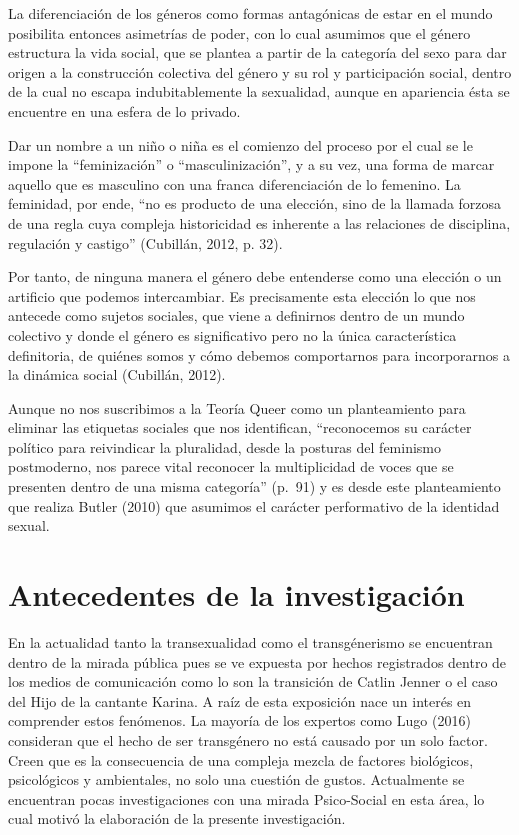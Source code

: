 La diferenciación de los géneros como formas antagónicas de estar en el mundo
posibilita entonces asimetrías de poder, con lo cual asumimos que el género
estructura la vida social, que se plantea a partir de la categoría del sexo para
dar origen a la construcción colectiva del género y su rol y participación
social, dentro de la cual no escapa indubitablemente la sexualidad, aunque en
apariencia ésta se encuentre en una esfera de lo privado.

Dar un nombre a un niño o niña es el comienzo del proceso por el cual se le
impone la “feminización” o “masculinización”, y a su vez, una forma de marcar
aquello que es masculino con una franca diferenciación de lo femenino.
La feminidad, por ende, “no es producto de una elección, sino de la llamada
forzosa de una regla cuya compleja historicidad es inherente a las relaciones de
disciplina, regulación y castigo” (Cubillán, 2012, p. 32).

Por tanto, de ninguna manera el género debe entenderse como una elección o un
artificio que podemos intercambiar.
Es precisamente esta elección lo que nos antecede como sujetos sociales, que
viene a definirnos dentro de un mundo colectivo y donde el género es
significativo pero no la única característica definitoria, de quiénes somos y
cómo debemos comportarnos para incorporarnos a la dinámica social (Cubillán,
2012).

Aunque no nos suscribimos a la Teoría Queer como un planteamiento para eliminar
las etiquetas sociales que nos identifican, “reconocemos su carácter político
para reivindicar la pluralidad, desde la posturas del feminismo postmoderno, nos
parece vital reconocer la multiplicidad de voces que se presenten dentro de
una misma categoría” (p.~91) y es desde este planteamiento que realiza Butler
(2010) que asumimos el carácter performativo de la identidad sexual.

\section{Antecedentes de la investigación}
En la actualidad tanto la transexualidad como el transgénerismo se encuentran
dentro de la mirada pública pues se ve expuesta por hechos registrados dentro de
los medios de comunicación como lo son la transición de Catlin Jenner o el caso
del Hijo de la cantante Karina.
A raíz de esta exposición nace un interés en comprender estos fenómenos.
La mayoría de los expertos como Lugo (2016) consideran que el hecho de ser
transgénero no está causado por un solo factor.
Creen que es la consecuencia de una compleja mezcla de factores biológicos,
psicológicos y ambientales, no solo una cuestión de gustos.
Actualmente se encuentran pocas investigaciones con una mirada Psico-Social en
esta área, lo cual motivó la elaboración de la presente investigación.

